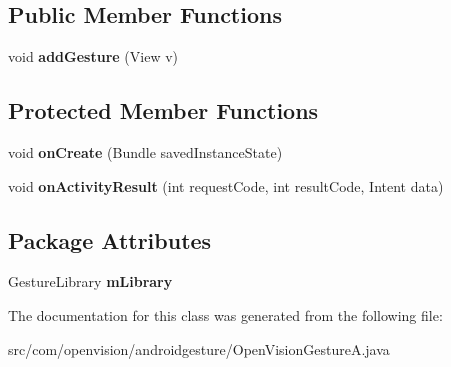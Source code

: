 \subsection*{\-Public \-Member \-Functions}
\begin{DoxyCompactItemize}
\item 
\hypertarget{classcom_1_1openvision_1_1androidgesture_1_1OpenVisionGestureA_aaefb608bb2eaa60a776790d2bfadc5b2}{void {\bfseries add\-Gesture} (\-View v)}\label{classcom_1_1openvision_1_1androidgesture_1_1OpenVisionGestureA_aaefb608bb2eaa60a776790d2bfadc5b2}

\end{DoxyCompactItemize}
\subsection*{\-Protected \-Member \-Functions}
\begin{DoxyCompactItemize}
\item 
\hypertarget{classcom_1_1openvision_1_1androidgesture_1_1OpenVisionGestureA_a6aac46c9881523b42753a5dd8b9c9af6}{void {\bfseries on\-Create} (\-Bundle saved\-Instance\-State)}\label{classcom_1_1openvision_1_1androidgesture_1_1OpenVisionGestureA_a6aac46c9881523b42753a5dd8b9c9af6}

\item 
\hypertarget{classcom_1_1openvision_1_1androidgesture_1_1OpenVisionGestureA_ad03964962b8011fedae6cdfcf2fffb28}{void {\bfseries on\-Activity\-Result} (int request\-Code, int result\-Code, \-Intent data)}\label{classcom_1_1openvision_1_1androidgesture_1_1OpenVisionGestureA_ad03964962b8011fedae6cdfcf2fffb28}

\end{DoxyCompactItemize}
\subsection*{\-Package \-Attributes}
\begin{DoxyCompactItemize}
\item 
\hypertarget{classcom_1_1openvision_1_1androidgesture_1_1OpenVisionGestureA_a2b0b06802f0a20591f9bff2ac648fb5b}{\-Gesture\-Library {\bfseries m\-Library}}\label{classcom_1_1openvision_1_1androidgesture_1_1OpenVisionGestureA_a2b0b06802f0a20591f9bff2ac648fb5b}

\end{DoxyCompactItemize}


\-The documentation for this class was generated from the following file\-:\begin{DoxyCompactItemize}
\item 
src/com/openvision/androidgesture/\-Open\-Vision\-Gesture\-A.\-java\end{DoxyCompactItemize}
